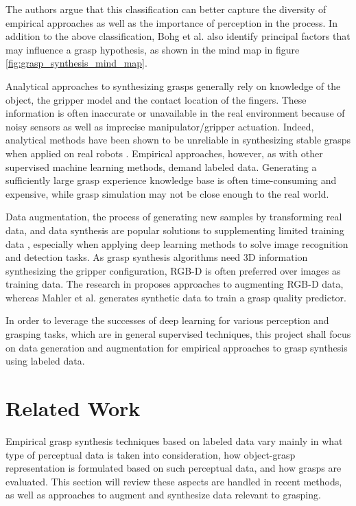 The authors argue that this classification can better capture the diversity of empirical approaches as well as
the importance of perception in the process. In addition to the above classification, Bohg et al. \cite{Bohg2014}
also identify principal factors that may influence a grasp hypothesis, as shown in the mind map in figure
\ref{fig:grasp_synthesis_mind_map}.

Analytical approaches to synthesizing grasps generally rely on knowledge of the object, the gripper model and the
contact location of the fingers. These information is often inaccurate or unavailable in the real environment
because of noisy sensors as well as imprecise manipulator/gripper actuation. Indeed, analytical methods have been
shown to be unreliable in synthesizing stable grasps when applied on real robots
\cite{Kappler2015, Rubert2017, WeiszAllen2012}. Empirical approaches, however, as with other supervised machine
learning methods, demand labeled data. Generating a sufficiently large grasp experience knowledge base is often
time-consuming and expensive, while grasp simulation may not be close enough to the real world.

Data augmentation, the process of generating new samples by transforming real data, and data synthesis are popular
solutions to supplementing limited training data \cite{Fawzi2016, Shrivastava2017}, especially when applying deep
learning methods to solve image recognition and detection tasks. As grasp synthesis algorithms need 3D information
synthesizing the gripper configuration, RGB-D is often preferred over images as training data. The research in
\cite{Eitel2015,Gupta2014RGBDFeatures} proposes approaches to augmenting RGB-D data, whereas Mahler et al.
\cite{mahler2017} generates synthetic data to train a grasp quality predictor.

In order to leverage the successes of deep learning for various perception and grasping tasks, which are in general
supervised techniques, this project shall focus on data generation and augmentation for empirical approaches to grasp
synthesis using labeled data.

\pagebreak
\section{Related Work}
Empirical grasp synthesis techniques based on labeled data vary mainly in what type of perceptual data is taken into
consideration, how object-grasp representation is formulated based on such perceptual data, and how grasps are
evaluated. This section will review these aspects are handled in recent methods, as well as approaches to augment and
synthesize data relevant to grasping.

